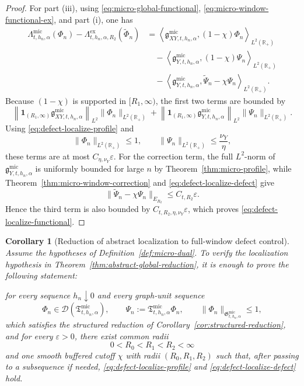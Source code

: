 \documentclass[11pt,a4paper]{amsart}
\theoremstyle{plain}
\newtheorem{corollary}[theorem]{Corollary}
\theoremstyle{definition}
\theoremstyle{remark}
\newcommand{\R}{\mathbb{R}}
\newcommand{\one}{\mathbf 1}
\begin{document}
\begin{proof}
For part (iii), using \eqref{eq:micro-global-functional},
\eqref{eq:micro-window-functional-ex}, and part (i), one has
\begin{align*}
\Lambda_{t,h_n,\alpha}^{\mathrm{mic}}(\Phi_n)
-\Lambda_{t,h_n,\alpha,R_2}^{\mathrm{ex}}(\widetilde\Phi_n)
&=
\left\langle
\mathfrak g_{XY,t,h_n,\alpha}^{\mathrm{mic}},
(1-\chi)\Phi_n
\right\rangle_{L^2(\R_+)}\\
&\quad-
\left\langle
\mathfrak g_{Y,t,h_n,\alpha}^{\mathrm{mic}},
(1-\chi)\Psi_n
\right\rangle_{L^2(\R_+)}\\
&\quad-
\left\langle
\mathfrak g_{Y,t,h_n,\alpha}^{\mathrm{mic}},
\widetilde\Psi_n-\chi\Psi_n
\right\rangle_{L^2(\R_+)}.
\end{align*}
Because \((1-\chi)\) is supported in \([R_1,\infty)\), the first two terms are bounded by
\[
\left\|
\one_{(R_1,\infty)}
\mathfrak g_{XY,t,h_n,\alpha}^{\mathrm{mic}}
\right\|_{L^2}
\|\Phi_n\|_{L^2(\R_+)}
+
\left\|
\one_{(R_1,\infty)}
\mathfrak g_{Y,t,h_n,\alpha}^{\mathrm{mic}}
\right\|_{L^2}
\|\Psi_n\|_{L^2(\R_+)}.
\]
Using \eqref{eq:defect-localize-profile} and
\[
\|\Phi_n\|_{L^2(\R_+)}\le1,
\qquad
\|\Psi_n\|_{L^2(\R_+)}\le \frac{\nu_Y}{\eta},
\]
these terms are at most \(C_{\eta,\nu_Y}\varepsilon\). For the correction term, the full
\(L^2\)-norm of \(\mathfrak g_{Y,t,h_n,\alpha}^{\mathrm{mic}}\) is uniformly bounded for large \(n\)
by Theorem~\ref{thm:micro-profile}, while Theorem~\ref{thm:micro-window-correction} and
\eqref{eq:defect-localize-defect} give
\[
\|\widetilde\Psi_n-\chi\Psi_n\|_{E_{R_2}}
\le
C_{t,R_2}\varepsilon.
\]
Hence the third term is also bounded by \(C_{t,R_2,\eta,\nu_Y}\varepsilon\), which proves
\eqref{eq:defect-localize-functional}.
\end{proof}

\begin{corollary}[Reduction of abstract localization to full-window defect control]
\label{cor:defect-localization}
Assume the hypotheses of Definition~\ref{def:micro-dual}. To verify the localization hypothesis in
Theorem~\ref{thm:abstract-global-reduction}, it is enough to prove the following statement:

\smallskip
\noindent
for every sequence \(h_n\downarrow0\) and every graph-unit sequence
\[
\Phi_n\in\mathcal D(\mathfrak T_{t,h_n,\alpha}^{\mathrm{mic}}),
\qquad
\Psi_n:=\mathfrak T_{t,h_n,\alpha}^{\mathrm{mic}}\Phi_n,
\qquad
\|\Phi_n\|_{\mathfrak G_{t,h_n,\alpha}^{\mathrm{mic}}}\le1,
\]
which satisfies the structured reduction of Corollary~\ref{cor:structured-reduction}, and for every
\(\varepsilon>0\), there exist common radii
\[
0<R_0<R_1<R_2<\infty
\]
and one smooth buffered cutoff \(\chi\) with radii \((R_0,R_1,R_2)\) such that, after passing to a
subsequence if needed,
\eqref{eq:defect-localize-profile} and \eqref{eq:defect-localize-defect} hold.
\end{corollary}
\end{document}
